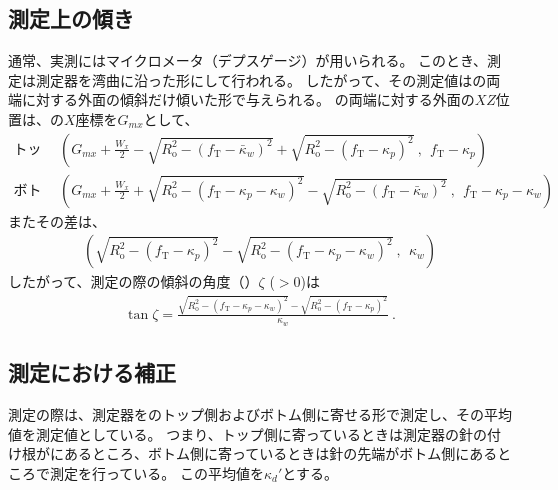\subsection{測定上の傾き}
通常、実測にはマイクロメータ（デプスゲージ）が用いられる。
このとき、測定は測定器を湾曲に沿った形にして行われる。
したがって、その測定値は\KeywayWidth の両端に対する外面の傾斜だけ傾いた形で与えられる。
\KeywayWidth の両端に対する外面の$XZ$位置は、\KeywayCenter の$X$座標を$G_{mx}$として、
\begin{align*}
  \text{トップ側：}&~~
  \left(
  G_{mx}+\frac{W_x}2
  -\sqrt{R_\mathrm o^2-(f_\mathrm T-\bar\kappa_w)^2}
  +\sqrt{R_\mathrm o^2-(f_\mathrm T-\kappa_p)^2}~,~~
  f_\mathrm T-\kappa_p
  \right)\\
  \text{ボトム側：}&~~
  \left(
  G_{mx}+\frac{W_x}2
  +\sqrt{R_\mathrm o^2-(f_\mathrm T-\kappa_p-\kappa_w)^2}
  -\sqrt{R_\mathrm o^2-(f_\mathrm T-\bar\kappa_w)^2}~,~~
  f_\mathrm T-\kappa_p-\kappa_w
  \right)
\end{align*}
またその差は、
\begin{align*}
  \left(
  \sqrt{R_\mathrm o^2-(f_\mathrm T-\kappa_p)^2}
  -\sqrt{R_\mathrm o^2-(f_\mathrm T-\kappa_p-\kappa_w)^2}~,~~
  \kappa_w
  \right)
\end{align*}
したがって、測定の際の傾斜の角度（\KeywayDepthMeasurementAngle）$\zeta$ ($> 0$)は
\begin{align}
  \label{eq:angleZeta}
  \tan\zeta
  = \frac{\sqrt{R_\mathrm o^2-\left(f_\mathrm T-\kappa_p-\kappa_w\right)^2}
          -\sqrt{R_\mathrm o^2-\left(f_\mathrm T-\kappa_p\right)^2}}
         {\kappa_w}\ .
\end{align}


\clearpage
\subsection{測定における\KeywayDepth 補正}%
測定の際は、測定器を\Keyway のトップ側およびボトム側に寄せる形で測定し、その平均値を測定値としている。
つまり、トップ側に寄っているときは測定器の針の付け根が\KeywayPos にあるところ、ボトム側に寄っているときは針の先端が\KeywayWidth ボトム側にあるところで測定を行っている。
この平均値を$\kappa_d'$とする。

